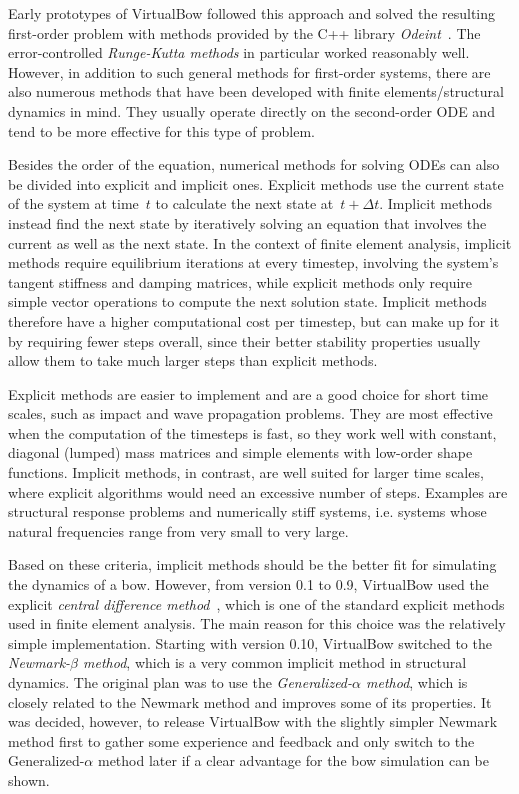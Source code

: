 Early prototypes of VirtualBow followed this approach and solved the resulting first-order problem with methods provided by the C++ library \textit{Odeint}~\cite{bib:ahnert2011}.
The error-controlled \textit{Runge-Kutta methods} in particular worked reasonably well.
However, in addition to such general methods for first-order systems, there are also numerous methods that have been developed with finite elements/structural dynamics in mind.
They usually operate directly on the second-order ODE and tend to be more effective for this type of problem.

Besides the order of the equation, numerical methods for solving ODEs can also be divided into explicit and implicit ones.
Explicit methods use the current state of the system at time~$t$ to calculate the next state at~$t + \Delta t$.
Implicit methods instead find the next state by iteratively solving an equation that involves the current as well as the next state.
In the context of finite element analysis, implicit methods require equilibrium iterations at every timestep, involving the system's tangent stiffness and damping matrices, while explicit methods only require simple vector operations to compute the next solution state.
Implicit methods therefore have a higher computational cost per timestep, but can make up for it by requiring fewer steps overall, since their better stability properties usually allow them to take much larger steps than explicit methods.

Explicit methods are easier to implement and are a good choice for short time scales, such as impact and wave propagation problems.
They are most effective when the computation of the timesteps is fast, so they work well with constant, diagonal (lumped) mass matrices and simple elements with low-order shape functions.
Implicit methods, in contrast, are well suited for larger time scales, where explicit algorithms would need an excessive number of steps.
Examples are structural response problems and numerically stiff systems, i.e. systems whose natural frequencies range from very small to very large.

Based on these criteria, implicit methods should be the better fit for simulating the dynamics of a bow.
However, from version 0.1 to 0.9, VirtualBow used the explicit \textit{central difference method}~\cite{bib:bathe2006}, which is one of the standard explicit methods used in finite element analysis.
The main reason for this choice was the relatively simple implementation.
Starting with version 0.10, VirtualBow switched to the \textit{Newmark-$\beta$ method}, which is a very common implicit method in structural dynamics.
The original plan was to use the \textit{Generalized-$\alpha$ method}, which is closely related to the Newmark method and improves some of its properties.
It was decided, however, to release VirtualBow with the slightly simpler Newmark method first to gather some experience and feedback and only switch to the Generalized-$\alpha$ method later if a clear advantage for the bow simulation can be shown.

